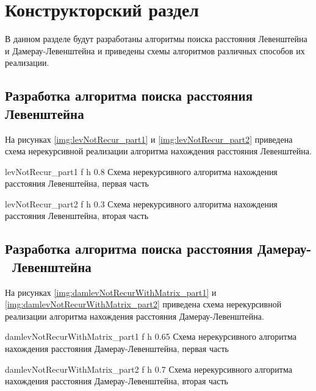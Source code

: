 \chapter{Конструкторский раздел}

В данном разделе будут разработаны алгоритмы поиска расстояния Левенштейна и Дамерау-Левенштейна и приведены схемы алгоритмов различных способов их реализации.

\section{Разработка алгоритма поиска расстояния Левенштейна}

На рисунках \ref{img:levNotRecur_part1} и \ref{img:levNotRecur_part2}
приведена схема нерекурсивной реализации алгоритма нахождения расстояния Левенштейна.

{levNotRecur_part1} %
{f} %
{h} %
{0.8\textwidth} %
{Схема нерекурсивного алгоритма нахождения расстояния Левенштейна, первая часть} %

{levNotRecur_part2} %
{f} %
{h} %
{0.3\textwidth} %
{Схема нерекурсивного алгоритма нахождения расстояния Левенштейна, вторая часть} %

\clearpage

\section{Разработка алгоритма поиска расстояния Дамерау- Левенштейна}

На рисунках \ref{img:damlevNotRecurWithMatrix_part1} и \ref{img:damlevNotRecurWithMatrix_part2}
приведена схема нерекурсивной реализации алгоритма нахождения расстояния Дамерау-Левенштейна.

{damlevNotRecurWithMatrix_part1} %
{f} %
{h} %
{0.65\textwidth} %
{Схема нерекурсивного алгоритма нахождения расстояния Дамерау-Левенштейна, первая часть} %


{damlevNotRecurWithMatrix_part2} %
{f} %
{h} %
{0.7\textwidth} %
{Схема нерекурсивного алгоритма нахождения расстояния Дамерау-Левенштейна, вторая часть} %

